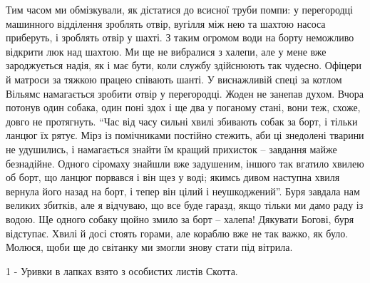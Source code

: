 Тим часом ми обмізкували, як дістатися до всисної труби помпи: у перегородці
машинного відділення зроблять отвір, вугілля між нею та шахтою насоса
приберуть, і зроблять отвір у шахті. З таким огромом води на борту неможливо
відкрити люк над шахтою. Ми ще не вибралися з халепи, але у мене вже
зароджується надія, як і має бути, коли службу здійснюють так чудесно. Офіцери
й матроси за тяжкою працею співають шанті. У виснажливій спеці за котлом
Вільямс намагається зробити отвір у перегородці. Жоден не занепав духом. Вчора
потонув один собака, один поні здох і ще два у поганому стані, вони теж, схоже,
довго не протягнуть. \enquote{Час від часу сильні хвилі збивають собак за борт, і
тільки ланцюг їх рятує. Мірз із помічниками постійно стежить, аби ці знедолені
тварини не удушились, і намагається знайти їм кращий прихисток – завдання майже
безнадійне. Одного сіромаху знайшли вже задушеним, іншого так вгатило хвилею об
борт, що ланцюг порвався і він щез у воді; якимсь дивом наступна хвиля вернула
його назад на борт, і тепер він цілий і неушкоджений}. Буря завдала нам великих
збитків, але я відчуваю, що все буде гаразд, якщо тільки ми дамо раду із водою.
Ще одного собаку щойно змило за борт – халепа! Дякувати Богові, буря відступає.
Хвилі й досі стоять горами, але кораблю вже не так важко, як було. Молюся, щоби
ще до світанку ми змогли знову стати під вітрила.

1 - Уривки в лапках взято з особистих листів Скотта.
